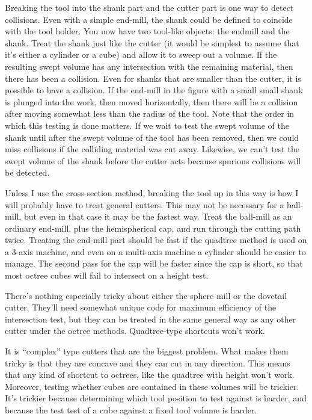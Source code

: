 \documentclass[titlepage,oneside,10pt]{article}
\begin{document}
Breaking the tool into the shank part and the cutter part is one way
to detect collisions. Even with a simple end-mill, the shank could be
defined to coincide with the tool holder. You now have two tool-like
objects: the endmill and the shank. Treat the shank just like the
cutter (it would be simplest to assume that it's either a cylinder or
a cube) and allow it to sweep out a volume. If the resulting swept
volume has any intersection with the remaining material, then there
has been a collision. Even for shanks that are smaller than the
cutter, it is possible to have a collision. If the end-mill in the
figure with a small small shank is plunged into the work, then moved
horizontally, then there will be a collision after moving somewhat
less than the radius of the tool. Note that the order in which this
testing is done matters. If we wait to test the swept volume of the
shank until after the swept volume of the tool has been removed, then
we could miss collisions if the colliding material was cut
away. Likewise, we can't test the swept volume of the shank before the
cutter acts because spurious collisions will be detected.

Unless I use the cross-section method, breaking the tool up in this
way is how I will probably have to treat general cutters. This may not
be necessary for a ball-mill, but even in that case it may be the
fastest way. Treat the ball-mill as an ordinary end-mill, plus the
hemispherical cap, and run through the cutting path twice. Treating
the end-mill part should be fast if the quadtree method is used on a
3-axis machine, and even on a multi-axis machine a cylinder should be
easier to manage. The second pass for the cap will be faster since the
cap is short, so that most octree cubes will fail to intersect on a
height test.

There's nothing especially tricky about either the sphere mill or the
dovetail cutter. They'll need somewhat unique code for maximum
efficiency of the intersection test, but they can be treated in the
same general way as any other cutter under the octree
methods. Quadtree-type shortcuts won't work.

It is ``complex'' type cutters that are the biggest problem. What
makes them tricky is that they are concave and they can cut in any
direction. This means that any kind of shortcut to octrees, like the
quadtree with height won't work. Moreover, testing whether cubes are
contained in these volumes will be trickier. It's trickier because
determining which tool position to test against is harder, and because
the test test of a cube against a fixed tool volume is harder.
\end{document}
